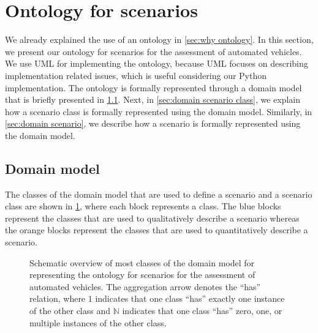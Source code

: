 \section{Ontology for scenarios}
\label{sec:ontology}

We already explained the use of an ontology in \cref{sec:why ontology}. In this section, we present our ontology for scenarios for the assessment of automated vehicles. 
We use UML for implementing the ontology, because UML focuses on describing implementation related issues, which is useful considering our Python implementation.
The ontology is formally represented through a domain model that is briefly presented in \cref{sec:domain model}. Next, in \cref{sec:domain scenario class}, we explain how a scenario class is formally represented using the domain model. Similarly, in \cref{sec:domain scenario}, we describe how a scenario is formally represented using the domain model. 



\subsection{Domain model}
\label{sec:domain model}

The classes of the domain model that are used to define a scenario and a scenario class are shown in \cref{fig:ontology classes}, where each block represents a class. The blue blocks represent the classes that are used to qualitatively describe a scenario whereas the orange blocks represent the classes that are used to quantitatively describe a scenario. 

\begin{figure}
	\centering
	
	\caption{\cbstart Schematic overview of most classes of the domain model for representing the ontology for scenarios for the assessment of automated vehicles. The aggregation arrow denotes the ``has'' relation, where $1$ indicates that one class ``has'' exactly one instance of the other class and $\mathbb{N}$ indicates that one class ``has'' zero, one, or multiple instances of the other class.\cbend}
	\label{fig:ontology classes}
\end{figure}

